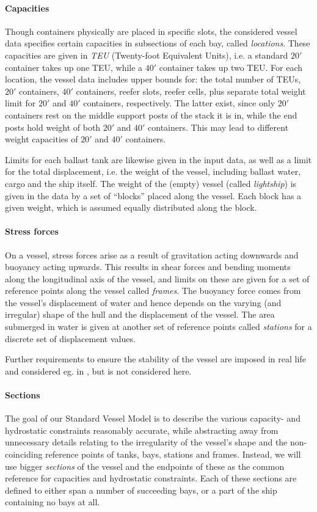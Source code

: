 \paragraph{Capacities}
Though containers physically are placed in specific slots, the considered vessel data specifies certain capacities in subsections of each bay, called \emph{locations}.  
These capacities are given in \emph{TEU} (Twenty-foot Equivalent Units), i.e. a standard $20'$ container takes up one TEU, while a $40'$ container takes up two TEU. For each location, the vessel data includes upper bounds for: the total number of TEUs, $20'$ containers, $40'$ containers, reefer slots, reefer cells, plus separate total weight limit for $20'$ and $40'$ containers, respectively. The latter exist, since only $20'$ containers rest on the middle support posts of the stack it is in, while the end posts hold weight of both $20'$ and $40'$ containers. This may lead to different weight capacities of $20'$ and $40'$ containers.

Limits for each ballast tank are likewise given in the input data, as well as a limit for the total displacement, i.e. the weight of the vessel, including ballast water, cargo and the ship itself. 
%
The weight of the (empty) vessel (called \emph{lightship}) is given in the data by a set of ``blocks'' placed along the vessel. Each block has a given weight, which is assumed equally distributed along the block. 

\paragraph{Stress forces}
On a vessel, stress forces arise as a result of gravitation acting downwards and buoyancy acting upwards. This results in shear forces and bending moments along the longitudinal axis of the vessel, and limits on these are given for a set of reference points along the vessel called \emph{frames}. 
%
The buoyancy force comes from the vessel's displacement of water and hence depends on the varying (and irregular) shape of the hull and the displacement of the vessel. The area submerged in water  is given at another set of reference points called \emph{stations} for a discrete set of displacement values.   


Further requirements to ensure the stability of the vessel are imposed in real life and considered eg. in \cite{AlbertosThesis}, but is not considered here.

\paragraph{Sections}
The goal of our Standard Vessel Model is to describe the various capacity- and hydrostatic constraints reasonably accurate, while abstracting away from unnecessary details relating to the irregularity of the vessel's shape and the non-coinciding reference points of tanks, bays, stations and frames. Instead, we will use bigger \emph{sections} of the vessel and the endpoints of these as the common reference for capacities and hydrostatic constraints.
Each of these sections are defined to either span a number of succeeding bays, or a part of the ship containing no bays at all.


